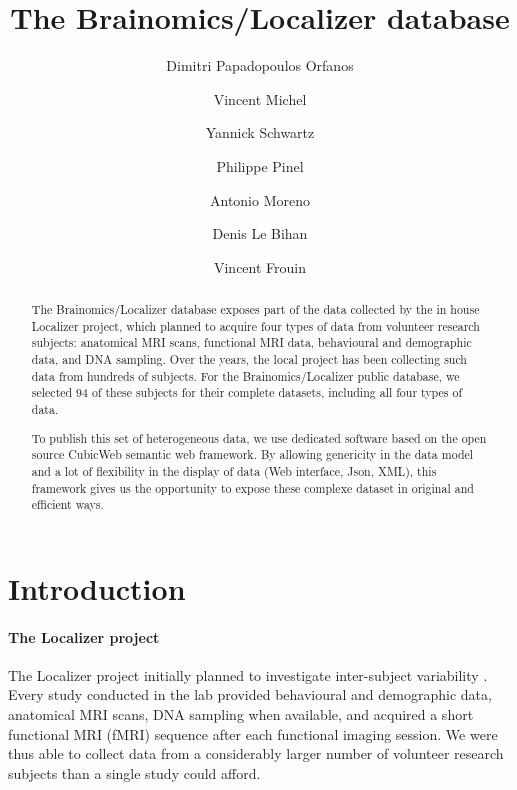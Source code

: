 \documentclass[review]{elsarticle}
\begin{document}
\begin{frontmatter}

\title{The Brainomics/Localizer database}

\author[Neurospin]{Dimitri Papadopoulos Orfanos}
\author[Logilab]{Vincent Michel}
\author[Parietal,Neurospin]{Yannick Schwartz}
\author[U992,Neurospin,ParisSud]{Philippe Pinel}
\author[U992,Neurospin,ParisSud]{Antonio Moreno}
\author[Neurospin]{Denis Le Bihan}
\author[Neurospin]{Vincent Frouin}

\address[Neurospin]{CEA, DSV/I2BM, NeuroSpin, 91191 Gif-sur-Yvette, France}
\address[U992]{INSERM, U992, Cognitive Neuroimaging Unit, 91191 Gif-sur-Yvette, France}
\address[Parietal]{Parietal team, Inria Saclay Île-de-France, 91120 Palaiseau, France}
\address[ParisSud]{Univ. Paris-Sud, Cognitive Neuroimaging Unit, 91191 Gif-sur-Yvette, France}
\address[Logilab]{Logilab, 104 boulevard Auguste Blanqui, 75013 Paris, France}

\begin{abstract}
The Brainomics/Localizer database exposes part of the data collected by the in house Localizer project, which planned to acquire four types of data from volunteer research subjects: anatomical MRI scans, functional MRI data, behavioural and demographic data, and DNA sampling. Over the years, the local project has been collecting such data from hundreds of subjects. For the Brainomics/Localizer public database, we selected 94 of these subjects for their complete datasets, including all four types of data.

To publish this set of heterogeneous data, we use dedicated software based on the open source CubicWeb semantic web framework. By allowing genericity in the data model and a lot of flexibility in the display of data (Web interface, Json, XML), this framework gives us the opportunity to expose these complexe dataset in original and efficient ways.
\end{abstract}

\end{frontmatter}


\section{Introduction}

\paragraph{The Localizer project} The Localizer project initially planned to investigate inter-subject variability \cite{Pinel2007}. Every study conducted in the lab provided behavioural and demographic data, anatomical MRI scans, DNA sampling when available, and acquired a short functional MRI (fMRI) sequence after each functional imaging session. We were thus able to collect data from a considerably larger number of volunteer research subjects than a single study could afford. 
\end{document}
